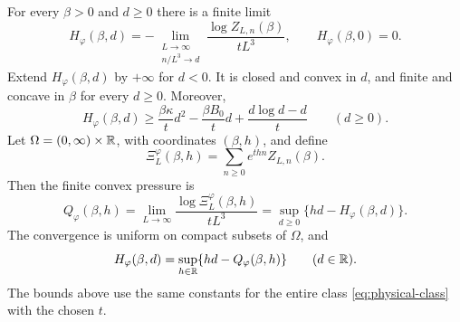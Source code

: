 \begin{proposition}
\label{prop:thermodynamics}
For every $\beta>0$ and $d\ge0$ there is a finite limit
\begin{equation}
 H_\varphi(\beta,d)
 =-\lim_{\substack{L\to\infty\\n/L^3\to d}}
       \frac{\log Z_{L,n}(\beta)}{tL^3},
 \qquad H_\varphi(\beta,0)=0.
 \label{eq:canonical-limit}
\end{equation}
Extend $H_\varphi(\beta,d)$ by $+\infty$ for $d<0$. It is closed
and convex in $d$, and finite and concave in $\beta$ for every
$d\ge0$. Moreover,
\begin{equation}
 H_\varphi(\beta,d)
 \ge \frac{\beta\kappa}{t}d^2
       -\frac{\beta B_0}{t}d
       +\frac{d\log d-d}{t}
 \qquad(d\ge0).
 \label{eq:coercivity}
\end{equation}
Let $\Omega=(0,\infty)\times\mathbb R$, with coordinates $(\beta,h)$,
and define
\[
 \Xi_L^\varphi(\beta,h)
   =\sum_{n\ge0}e^{thn}Z_{L,n}(\beta).
\]
Then the finite convex pressure is
\begin{equation}
 Q_\varphi(\beta,h)
 =\lim_{L\to\infty}\frac{\log\Xi_L^\varphi(\beta,h)}{tL^3}
 =\sup_{d\ge0}\{hd-H_\varphi(\beta,d)\}.
 \label{eq:pressure-duality}
\end{equation}
The convergence is uniform on compact subsets of $\Omega$, and
\begin{equation}
 H_\varphi(\beta,d)
 =\sup_{h\in\mathbb R}\{hd-Q_\varphi(\beta,h)\}
 \qquad(d\in\mathbb R).
 \label{eq:partial-conjugacy}
\end{equation}
The bounds above use the same constants for the entire class
\eqref{eq:physical-class} with the chosen $t$.
\end{proposition}

